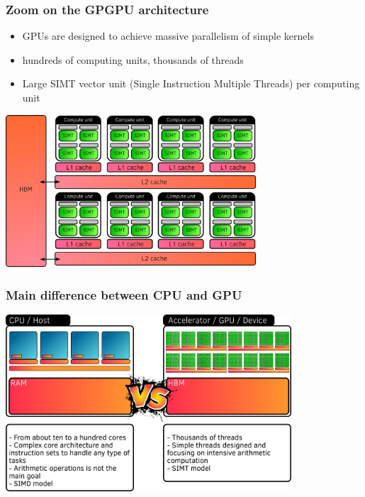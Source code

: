 \documentclass[aspectratio=169]{beamer}
\begin{document}
\begin{frame}
    \frametitle{Zoom on the GPGPU architecture}

\small
\begin{itemize}
    \item GPUs are designed to achieve massive parallelism of simple kernels
    \item hundreds of computing units, thousands of threads
    \item Large SIMT vector unit (Single Instruction Multiple Threads) per computing unit
\end{itemize}

\normalsize
\hspace{0.2cm}

\begin{center}
    \includegraphics[width=0.7\textwidth]{../../images/gpu_architecture.png}
\end{center}

\end{frame}


\begin{frame}
    \frametitle{Main difference between CPU and GPU}

    \begin{center}
        \includegraphics[width=0.8\textwidth]{../../images/cpu_vs_gpu.png}
    \end{center}

\end{frame}
\end{document}

